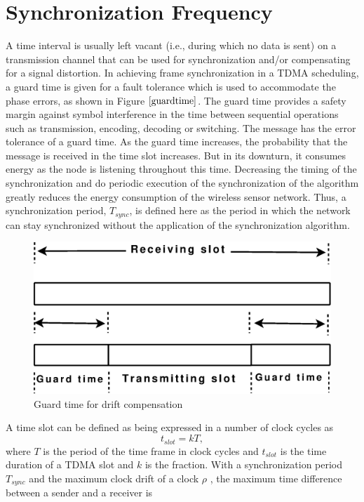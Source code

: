 \documentclass[a4paper,10pt]{report}
\begin{document}
\section{\textbf{Synchronization Frequency}}
A time interval is usually left vacant (i.e., during which no data is sent) on a transmission channel that can be used for synchronization and/or compensating for a signal distortion. In achieving frame synchronization in a TDMA scheduling, a guard time is given for a fault tolerance which is used to accommodate the phase errors, as shown in Figure $\ref{guardtime}$. The guard time provides a safety margin against symbol interference in the time between sequential operations such as transmission, encoding, decoding or switching. The message has the error tolerance of a guard time. As the guard time increases, the probability that the message is received in the time slot increases. But in its downturn, it consumes energy as the node is listening throughout this time.
\newline Decreasing the timing of the synchronization and do periodic execution of the synchronization of the algorithm greatly reduces
the energy consumption of the wireless sensor network. Thus, a synchronization period, $T_{sync}$, is defined here as the period in which the network can stay synchronized without the application of the synchronization algorithm.
\begin{figure}
\centering
\includegraphics[width=0.6 \textwidth]{guardtime}
\caption{Guard time for drift compensation} \label{guardtime}
\end{figure}
\newline
A time slot can be defined as being expressed in a number of clock cycles as
\begin{equation}
t_{slot} = kT ,
\end{equation}
where $T$ is the period of the time frame in clock cycles and $t_{slot}$ is the time duration of a TDMA slot and $k$ is the fraction.
\newline
With a synchronization period $T_{sync}$ and the maximum clock drift of a clock $\rho$ , the maximum time difference between a sender and a receiver is
\end{document}
